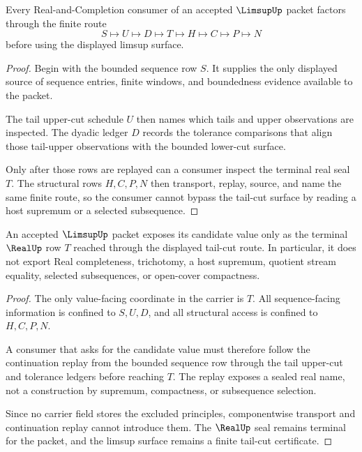 \begin{theorem}
\label{thm:limsup-tail-cut-route}
Every Real-and-Completion consumer of an accepted $\LimsupUp$ packet factors through the finite route
$$
S\longmapsto U\longmapsto D\longmapsto T\longmapsto H\longmapsto C\longmapsto P\longmapsto N
$$
before using the displayed limsup surface.
\end{theorem}
\begin{proof}
Begin with the bounded sequence row $S$. It supplies the only displayed source of sequence entries, finite windows, and boundedness evidence available to the packet.

The tail upper-cut schedule $U$ then names which tails and upper observations are inspected. The dyadic ledger $D$ records the tolerance comparisons that align those tail-upper observations with the bounded lower-cut surface.

Only after those rows are replayed can a consumer inspect the terminal real seal $T$. The structural rows $H,C,P,N$ then transport, replay, source, and name the same finite route, so the consumer cannot bypass the tail-cut surface by reading a host supremum or a selected subsequence.
\end{proof}

\begin{theorem}
\label{thm:limsup-real-seal-nonescape}
An accepted $\LimsupUp$ packet exposes its candidate value only as the terminal $\RealUp$ row $T$ reached through the displayed tail-cut route. In particular, it does not export Real completeness, trichotomy, a host supremum, quotient stream equality, selected subsequences, or open-cover compactness.
\end{theorem}
\begin{proof}
The only value-facing coordinate in the carrier is $T$. All sequence-facing information is confined to $S,U,D$, and all structural access is confined to $H,C,P,N$.

A consumer that asks for the candidate value must therefore follow the continuation replay from the bounded sequence row through the tail upper-cut and tolerance ledgers before reaching $T$. The replay exposes a sealed real name, not a construction by supremum, compactness, or subsequence selection.

Since no carrier field stores the excluded principles, componentwise transport and continuation replay cannot introduce them. The $\RealUp$ seal remains terminal for the packet, and the limsup surface remains a finite tail-cut certificate.
\end{proof}

